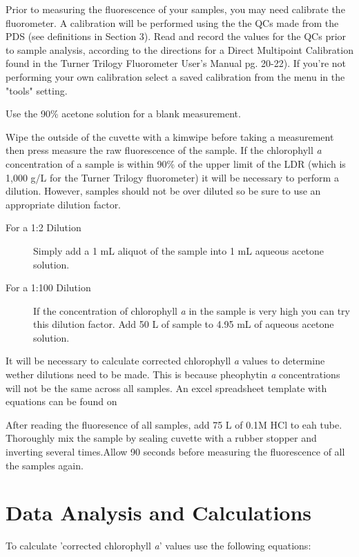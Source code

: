 \documentclass[12pt]{../SOP3_alpha}
\begin{document}
\NP Prior to measuring the fluorescence of your samples, you may need calibrate the fluorometer. A calibration will be performed using the the QCs made from the PDS (see definitions in Section 3). Read and record the values for the QCs prior to sample analysis, according to the directions for a Direct Multipoint Calibration found in the Turner Trilogy Fluorometer User's Manual pg. 20-22). If you're not performing your own calibration select a saved calibration from the menu in the "tools" setting.

\NP Use the 90\% acetone solution for a blank measurement.


\NP Wipe the outside of the cuvette with a kimwipe before taking a measurement then press measure the raw fluorescence of the sample. If the chlorophyll \textit{a} concentration of a sample is within 90\% of the upper limit of the LDR (which is 1,000 \micro g/L for the Turner Trilogy fluorometer) it will be necessary to perform a dilution. However, samples should not be over diluted so be sure to use an appropriate dilution factor. 

\begin{description} 
\item[For a 1:2 Dilution] Simply add a 1 mL aliquot of the sample into 1 mL aqueous acetone solution.
\item[For a 1:100 Dilution] If the concentration of chlorophyll \textit{a} in the sample is very high you can try this dilution factor. Add 50 \micro L of sample to 4.95 mL of aqueous acetone solution. 
\end{description}

\NP It will be necessary to calculate corrected chlorophyll \textit{a} values to determine wether dilutions need to be made. This is because pheophytin \textit{a} concentrations will not be the same across all samples. An excel spreadsheet template with equations can be found on %

\NP After reading the fluoresence of all samples, add 75 \micro L of  0.1M HCl to eah tube. Thoroughly mix the sample by sealing cuvette with a rubber stopper and inverting several times.Allow 90 seconds before measuring the fluorescence of all the samples again. 

\section{Data Analysis and Calculations}
To calculate 'corrected chlorophyll \textit{a}' values use the following equations: %
\end{document}

